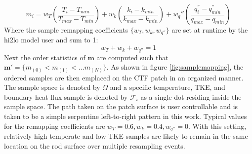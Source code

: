 \begin{equation}
    m_i = w_T \left( \frac{T_i - T_{min}}{T_{max} - T_{min}} \right) + w_k \left( \frac{k_i - k_{min}}{k_{max} - k_{min}} \right) +  w_q'' \left( \frac{q^{''}_i - q^{''}_{min}}{q_{max} - q_{min}} \right)
\label{eq:weighting}
\end{equation}
Where the sample remapping coefficients $\{w_T, w_k, w_{q''}\}$ are set at runtime by the hi2lo model user and sum to 1:
\begin{equation}
w_T + w_k + w_{q''} = 1
\end{equation}
Next the order statistics of $\mathbf m$ are computed such that $\mathbf m' = \{ m_{(0)} < m_{(1)}< ... m_{(N)} \}$.  As shown in figure \ref{fig:samplemapping}, the ordered samples are then emplaced on the CTF patch in an organized manner.  The sample space is denoted by $\Omega$ and a specific temperature, TKE, and boundary heat flux sample is denoted by $\mathcal F_i$ as a single dot residing inside the sample space.  The path taken on the patch surface is user controllable and is taken to be a simple serpentine left-to-right pattern in this work.
Typical values for the remapping coefficients are $w_T=0.6, w_k=0.4, w_{q''}=0$.  With this setting, relatively high temperate and low TKE samples are likely to remain in the same location on the rod surface over multiple resampling events.


